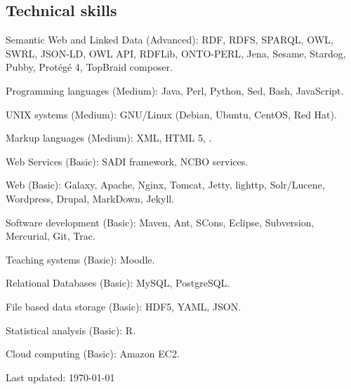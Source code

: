 \documentclass[11pt,fullpage]{article}
\renewenvironment{itemize}{
  \begin{list}{}{
    \setlength{\leftmargin}{1.5em} 
  }  
}{
  \end{list}
}
\begin{document}
\subsection*{Technical skills}
\begin{itemize}
	\item Semantic Web and Linked Data (Advanced): RDF, RDFS, SPARQL, OWL, SWRL, JSON-LD, OWL API, RDFLib, ONTO-PERL, Jena, Sesame, Stardog, Pubby, Prot\'eg\'e 4, TopBraid composer.
	\item Programming languages (Medium): Java, Perl, Python, Sed, Bash, JavaScript. 
	\item UNIX systems (Medium): GNU/Linux (Debian, Ubuntu, CentOS, Red Hat). 
	\item Markup languages (Medium): XML, HTML 5, \LaTeXe.
	\item Web Services (Basic): SADI framework, NCBO services.
	\item Web (Basic): Galaxy, Apache, Nginx, Tomcat, Jetty, lighttp, Solr/Lucene, Wordpress, Drupal, MarkDown, Jekyll.
	\item Software development (Basic): Maven, Ant, SCons, Eclipse, Subversion, Mercurial, Git, Trac.
	\item Teaching systems (Basic): Moodle.
	\item Relational Databases (Basic): MySQL, PostgreSQL.
	\item File based data storage (Basic): HDF5, YAML, JSON.
	\item Statistical analysis (Basic): R.
	\item Cloud computing (Basic): Amazon EC2.
\end{itemize}





\bigskip
\begin{center}
  \begin{footnotesize}
    Last updated: \today
  \end{footnotesize}
\end{center}



\end{document}
